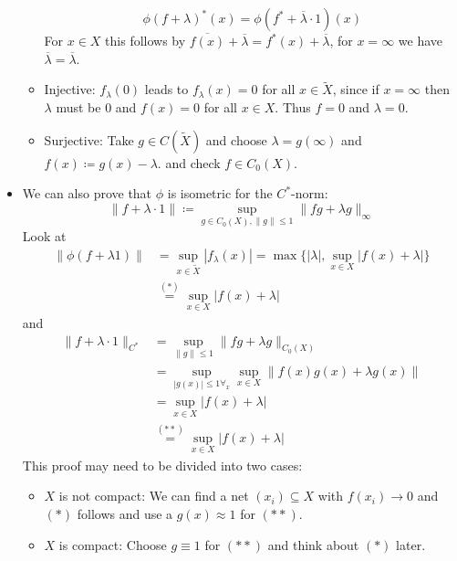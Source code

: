 \documentclass[a4paper]{article}
\begin{document}
\begin{exercise}[2.6]
\begin{itemize}
\begin{itemize}
			\begin{equation*}
				\phi(f + \lambda)^*(x) = \phi(f^* + \overline{\lambda} \cdot 1)(x)
			\end{equation*}
			For $x \in X$ this follows by $\overline{f(x)} + \overline{\lambda} =  f^*(x) + \overline{\lambda}$, for $x = \infty$ we have $\overline{\lambda} = \overline{\lambda}$. 
			\item Injective: $f_\lambda(0)$ leads to $f_\lambda(x) = 0$ for all $x \in \tilde X$, since if $x = \infty$ then $\lambda$ must be $0$ and $f(x) = 0$ for all $x \in X$. Thus $f = 0$ and $\lambda = 0$.
			\item Surjective: Take $g \in C(\tilde X)$  and choose $\lambda = g(\infty)$ and $f(x) \coloneq g(x) - \lambda$. and check $f \in C_0(X)$.
		\end{itemize}
		\item We can also prove that $\phi$ is isometric for the $C^*$-norm:
		\begin{equation*}
			\|f + \lambda \cdot 1\| \coloneq \sup_{g \in C_0(X), \|g\| \leq 1} \|fg + \lambda g \|_\infty
		\end{equation*}
		Look at
		\begin{align*}
			\| \phi(f + \lambda 1)\| &= \sup_{x \in \tilde{X}} | f_\lambda(x)| = \max \{ |\lambda|, \sup_{x \in X} |f(x) + \lambda| \}\\
			&\overset{(*)}{=} \sup_{x \in X} |f(x) + \lambda|
		\end{align*}
		and 
		\begin{align*}
			\| f + \lambda \cdot 1\|_{C^*} &= \sup_{\|g\| \leq 1} \|fg + \lambda g\|_{C_0(X)}\\
			&= \sup_{|g(x)| \leq 1 \forall_x} \sup_{x \in X} \| f(x) g(x) + \lambda g(x) \|\\
			&= \sup_{x \in X} |f(x) + \lambda|\\
			&\overset{(**)}{=} \sup_{x \in X} |f(x) + \lambda|
		\end{align*}
		This proof may need to be divided into two cases:
		\begin{itemize}
			\item $X$ is not compact: We can find a net $(x_i) \subseteq X$ with $f(x_i) \to 0$ and $(*)$ follows and use a $g(x) \approx 1$ for $(**)$.
			\item $X$ is compact: Choose $g \equiv 1$ for $(**)$ and think about $(*)$ later.
		\end{itemize}
	\end{itemize}
\end{exercise}
\end{document}
